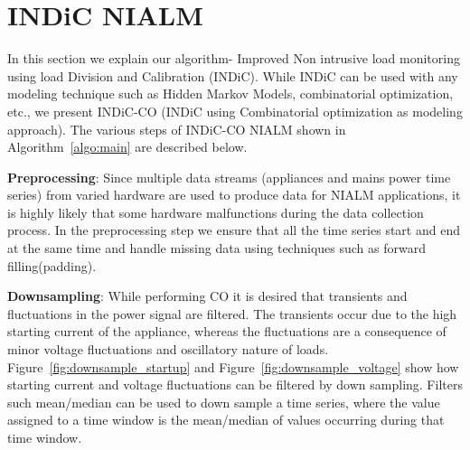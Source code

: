 \documentclass[conference]{IEEEtran}
\newcommand{\figref}[1]{Figure~\ref{#1}}
\newcommand{\algoref}[1]{Algorithm~\ref{#1}}
\begin{document}
\section{INDiC NIALM}
In this section we explain our algorithm- Improved Non intrusive load monitoring using load Division and Calibration (INDiC). While INDiC can be used with any modeling technique such as Hidden Markov Models\cite{rabiner}, combinatorial optimization, etc., we present INDiC-CO (INDiC using Combinatorial optimization as modeling approach). The various steps of INDiC-CO NIALM shown in \algoref{algo:main} are described below. 

\textbf{Preprocessing}: Since multiple data streams (appliances and mains power time series) from varied hardware are used to produce data for NIALM applications, it is highly likely that some hardware malfunctions during the data collection process. In the preprocessing step we ensure that all the time series start and end at the same time and handle missing data using techniques such as forward filling(padding).

\textbf{Downsampling}: While performing CO it is desired that transients and fluctuations in the power signal are filtered\cite{hart}. The transients occur due to the high starting current of the appliance, whereas the fluctuations are a consequence of minor voltage fluctuations and oscillatory nature of loads. \figref{fig:downsample_startup} and \figref{fig:downsample_voltage} show how starting current and voltage fluctuations can be filtered by down sampling. Filters such mean/median can be used to down sample a time series, where the value assigned to a time window is the mean/median of values occurring during that time window.
\end{document}
